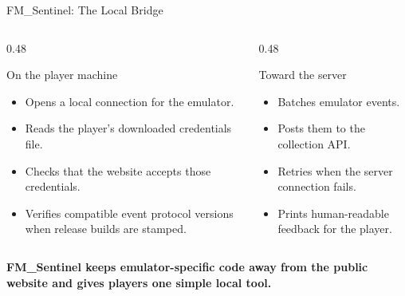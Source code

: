 \documentclass[aspectratio=169,11pt]{beamer}
\begin{document}
\begin{frame}{FM\_Sentinel: The Local Bridge}
  \begin{columns}[T,onlytextwidth]
    \begin{column}{0.48\textwidth}
      \begin{block}{On the player machine}
        \begin{itemize}
          \item Opens a local connection for the emulator.
          \item Reads the player's downloaded credentials file.
          \item Checks that the website accepts those credentials.
          \item Verifies compatible event protocol versions when release builds are stamped.
        \end{itemize}
      \end{block}
    \end{column}
    \begin{column}{0.48\textwidth}
      \begin{block}{Toward the server}
        \begin{itemize}
          \item Batches emulator events.
          \item Posts them to the collection API.
          \item Retries when the server connection fails.
          \item Prints human-readable feedback for the player.
        \end{itemize}
      \end{block}
    \end{column}
  \end{columns}

  \vspace{0.35cm}
  \begin{center}
    \large\textbf{FM\_Sentinel keeps emulator-specific code away from the public website and gives players one simple local tool.}
  \end{center}
\end{frame}
\end{document}
